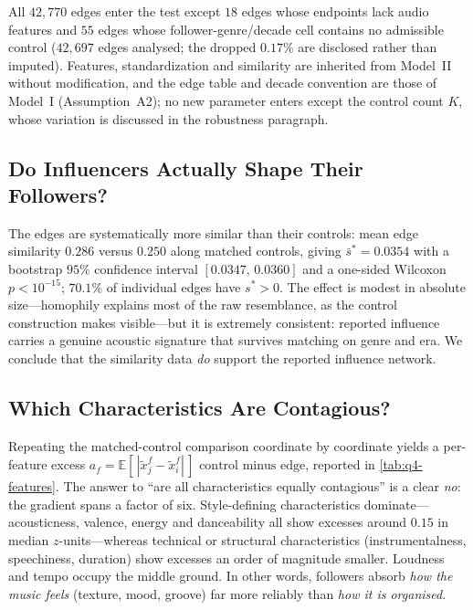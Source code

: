 All $42{,}770$ edges enter the test except $18$ edges whose endpoints
lack audio features and $55$ edges whose follower-genre/decade cell
contains no admissible control ($42{,}697$ edges analysed; the dropped
$0.17\%$ are disclosed rather than imputed). Features, standardization
and similarity are inherited from Model~II without modification, and the
edge table and decade convention are those of Model~I
(Assumption~A2); no new parameter enters except the control count $K$,
whose variation is discussed in the robustness paragraph.

\subsection{Do Influencers Actually Shape Their Followers?}\label{subsec:q4-overall}

The edges are systematically more similar than their controls: mean edge
similarity $0.286$ versus $0.250$ along matched controls, giving
$\bar{s}^{*}=0.0354$ with a bootstrap $95\%$ confidence interval
$[0.0347,\,0.0360]$ and a one-sided Wilcoxon $p<10^{-15}$;
$70.1\%$ of individual edges have $s^{*}>0$. The effect is modest in
absolute size---homophily explains most of the raw resemblance, as the
control construction makes visible---but it is extremely consistent:
reported influence carries a genuine acoustic signature that survives
matching on genre and era. We conclude that the similarity data
\emph{do} support the reported influence network.

\subsection{Which Characteristics Are Contagious?}\label{subsec:q4-features}

Repeating the matched-control comparison coordinate by coordinate
yields a per-feature excess
$a_f=\mathbb{E}[\,|\tilde{x}_j^{f}-\tilde{x}_{i}^{f}|\,]\text{ control minus edge}$,
reported in \cref{tab:q4-features}.
The answer to ``are all characteristics equally contagious'' is a clear
\emph{no}: the gradient spans a factor of six. Style-defining
characteristics dominate---acousticness, valence, energy and
danceability all show excesses around $0.15$ in median
$z$-units---whereas technical or structural characteristics
(instrumentalness, speechiness, duration) show excesses an order of
magnitude smaller. Loudness and tempo occupy the middle ground. In
other words, followers absorb \emph{how the music feels} (texture,
mood, groove) far more reliably than \emph{how it is organised}.

